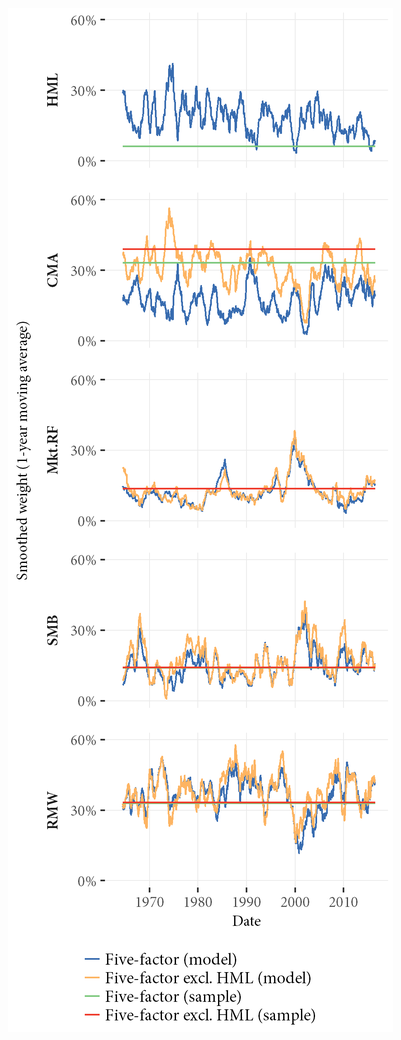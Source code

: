 \begin{figure}[htbp]
  \includegraphics[scale = 1]{graphics/Weights_5F_EXCL_HML_5F.png}

\end{figure}
